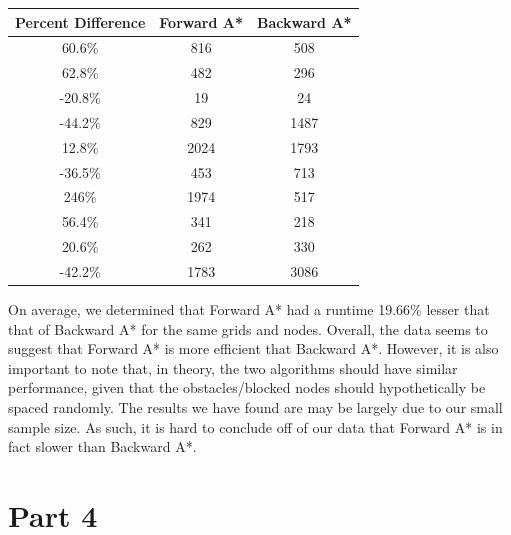 \documentclass{article}
\begin{document}
\begin{center}
	\begin{tabular}{|c|c|c|}
		\hline
		Percent Difference & Forward A* & Backward A* \\
		\hline
		60.6\% & 816 & 508 \\
		62.8\% & 482 & 296 \\
		-20.8\% & 19 & 24 \\
		-44.2\% & 829 & 1487 \\
		12.8\% & 2024 & 1793 \\
		-36.5\% & 453 & 713 \\
		246\% & 1974 & 517 \\
		56.4\% & 341 & 218 \\
		20.6\% & 262 & 330 \\
		-42.2\% & 1783 & 3086 \\
		\hline
	\end{tabular}
\end{center}

On average, we determined that Forward A* had a runtime 19.66\% lesser that that of Backward A* for the same grids and nodes. Overall, the data seems to suggest that Forward A* is more efficient that Backward A*. However, it is also important to note that, in theory, the two algorithms should have similar performance, given that the obstacles/blocked nodes should hypothetically be spaced randomly. The results we have found are may be largely due to our small sample size. As such, it is hard to conclude off of our data that Forward A* is in fact slower than Backward A*.
\section{Part 4}
\end{document}
